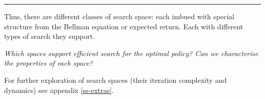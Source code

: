 \newpage
\begin{center}\rule{0.5\linewidth}{\linethickness}\end{center}

Thus, there are different classes of search space: each imbued with special
structure from the Bellman equation or expected return. Each with different types of search they
support.

\begin{displayquote}
\textit{Which spaces support efficient search for the optimal policy? Can we characterise the properties of each space?}
\end{displayquote}

For further exploration of search spaces (their iteration complexity and dynamics) see appendix \ref{ss-extras}.
